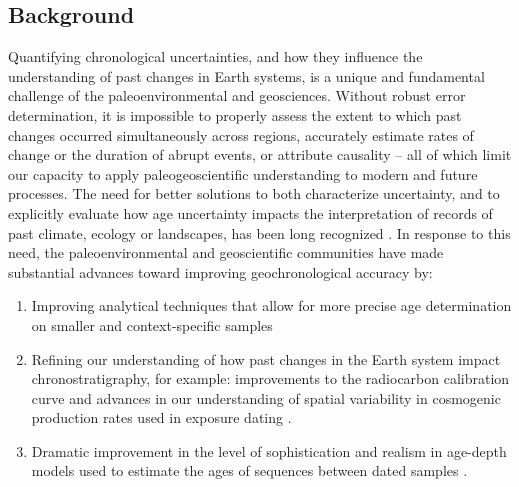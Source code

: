 \documentclass[gchron, manuscript]{copernicus}
\begin{document}
\introduction

\subsection{Background}

Quantifying chronological uncertainties, and how they influence the understanding of past changes in Earth systems, is a unique and fundamental challenge of the paleoenvironmental and geosciences.
Without robust error determination, it is impossible to properly assess the extent to which past changes occurred simultaneously across regions, accurately estimate rates of change or the duration of abrupt events, or attribute causality -- all of which limit our capacity to apply paleogeoscientific understanding to modern and future processes.
The need for better solutions to both characterize uncertainty, and to explicitly evaluate how age uncertainty impacts the interpretation of records of past climate, ecology or landscapes, has been long recognized \citep[e.g.,][ and reference therein]{Noren2013, NASEM_CORES_2020}.
In response to this need, the paleoenvironmental and geoscientific communities have made substantial advances toward improving geochronological accuracy by:

\begin{enumerate}
\def\labelenumi{\arabic{enumi}.}
\item
  Improving analytical techniques that allow for more precise age determination on smaller and context-specific samples \citep[e.g.,][]{Eggins2005, Santos_blank_2010, zander2020miniature}
\item
  Refining our understanding of how past changes in the Earth system impact chronostratigraphy, for example: improvements to the radiocarbon calibration curve \citep{Reimer09, intcal13, intcal20} and advances in our understanding of spatial variability in cosmogenic production rates used in exposure dating \citep{Balco2009, Masarik2009, charreau2019basinga}.
\item
  Dramatic improvement in the level of sophistication and realism in age-depth models used to estimate the ages of sequences between dated samples \citep[e.g.][]{parnell2008flexible, Ramsey2009Bayesian, Blaauw2010CLAM, Blaauw2011BACON}.
\end{enumerate}
\end{document}
